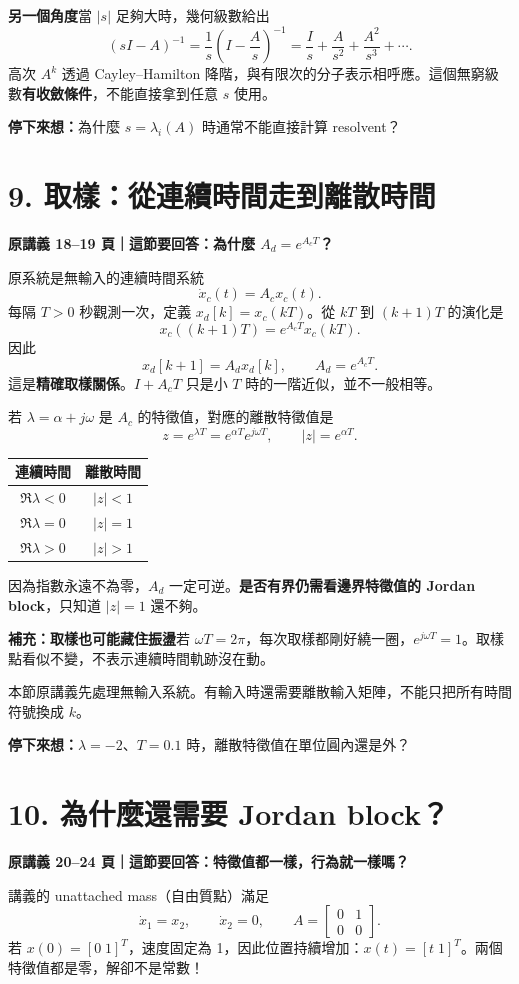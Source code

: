 \documentclass[12pt,a4paper]{article}
\newcommand{\topic}[3]{\clearpage\section*{#1}\textcolor{accent}{\textbf{原講義 #2 頁｜這節要回答：#3}}\par}
\newcommand{\checkq}[1]{\par\textbf{停下來想：}#1\par}
\begin{document}
\textbf{另一個角度}\quad 當 $|s|$ 足夠大時，幾何級數給出
\[
 (sI-A)^{-1}=\frac1s\left(I-\frac As\right)^{-1}
 =\frac Is+\frac A{s^2}+\frac{A^2}{s^3}+\cdots.
\]
高次 $A^k$ 透過 Cayley--Hamilton 降階，與有限次的分子表示相呼應。這個無窮級數\textbf{有收斂條件}，不能直接拿到任意 $s$ 使用。
\checkq{為什麼 $s=\lambda_i(A)$ 時通常不能直接計算 resolvent？}

\topic{9. 取樣：從連續時間走到離散時間}{18--19}{為什麼 $A_d=e^{A_cT}$？}
原系統是無輸入的連續時間系統
\[
 \dot x_c(t)=A_cx_c(t).
\]
每隔 $T>0$ 秒觀測一次，定義 $x_d[k]=x_c(kT)$。從 $kT$ 到 $(k+1)T$ 的演化是
\[
 x_c((k+1)T)=e^{A_cT}x_c(kT).
\]
因此
\[
\boxed{x_d[k+1]=A_dx_d[k],\qquad A_d=e^{A_cT}.}
\]
這是\textbf{精確取樣關係}。$I+A_cT$ 只是小 $T$ 時的一階近似，並不一般相等。

若 $\lambda=\alpha+j\omega$ 是 $A_c$ 的特徵值，對應的離散特徵值是
\[
 z=e^{\lambda T}=e^{\alpha T}e^{j\omega T},\qquad |z|=e^{\alpha T}.
\]
\begin{center}
\begin{tabular}{cc}
\toprule 連續時間 & 離散時間\\\midrule
$\Re\lambda<0$ & $|z|<1$\\
$\Re\lambda=0$ & $|z|=1$\\
$\Re\lambda>0$ & $|z|>1$\\\bottomrule
\end{tabular}
\end{center}
因為指數永遠不為零，$A_d$ 一定可逆。\textbf{是否有界仍需看邊界特徵值的 Jordan block}，只知道 $|z|=1$ 還不夠。

\textbf{補充：取樣也可能藏住振盪}\quad 若 $\omega T=2\pi$，每次取樣都剛好繞一圈，$e^{j\omega T}=1$。取樣點看似不變，不表示連續時間軌跡沒在動。

本節原講義先處理無輸入系統。有輸入時還需要離散輸入矩陣，不能只把所有時間符號換成 $k$。
\checkq{$\lambda=-2$、$T=0.1$ 時，離散特徵值在單位圓內還是外？}

\topic{10. 為什麼還需要 Jordan block？}{20--24}{特徵值都一樣，行為就一樣嗎？}
講義的 unattached mass（自由質點）滿足
\[
 \dot x_1=x_2,\qquad \dot x_2=0,\qquad
 A=\begin{bmatrix}0&1\\0&0\end{bmatrix}.
\]
若 $x(0)=[0\;1]^T$，速度固定為 1，因此位置持續增加：$x(t)=[t\;1]^T$。兩個特徵值都是零，解卻不是常數！
\end{document}
